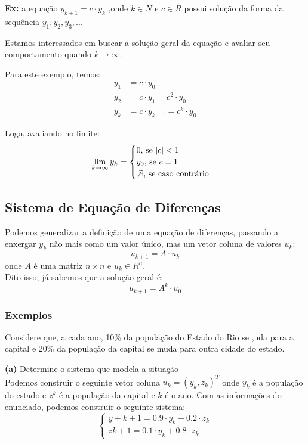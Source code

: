 \documentclass[12pt]{article}
\begin{document}
	\textbf{Ex:} a equação $y_{k+1}=c\cdot y_k\mbox{ ,onde }k\in N \mbox{ e }c\in R$ possui solução da forma da sequência $y_1,y_2,y_3,...$
	
	Estamos interessados em buscar a solução geral da equação e avaliar seu comportamento quando $k\to \infty$.
	
	Para este exemplo, temos:
	\begin{align*}
		y_1&=c\cdot y_0\\
		y_2&=c\cdot y_1=c^2\cdot y_0\\
		y_k&=c\cdot y_{k-1}=c^k\cdot y_0
	\end{align*}
	
	Logo, avaliando no limite:
	\begin{equation*}
		\lim_{k\to \infty}y_k=\begin{cases}0\mbox{, se }|c|<1\\ y_0\mbox{, se }c=1\\ \not\exists\mbox{, se caso contrário} 
		\end{cases}
	\end{equation*}
	
	\subsection{Sistema de Equação de Diferenças}
	Podemos generalizar a definição de uma equação de diferenças, passando a enxergar $y_k$ não mais como um valor único, mas um vetor coluna de valores $u_k$:
	\begin{equation*}
		u_{k+1}=A\cdot u_k
	\end{equation*}
	onde $A$ é uma matriz $n\times n$ e $u_k\in R^n$.\\
	
	Dito isso, já sabemos que a solução geral é:
	\begin{equation*}
		u_{k+1}=A^k\cdot u_0
	\end{equation*}
	
	\subsubsection{Exemplos}
	Considere que, a cada ano, 10\% da população do Estado do Rio se ,uda para a capital e 20\% da população da capital se muda para outra cidade do estado.
	
	\textbf{(a)} Determine o sistema que modela a situação\\
	
	Podemos construir o seguinte vetor coluna $u_k=(y_k,z_k)^T$ onde $y_k$ é a população do estado e $z^k$ é a população da capital e $k$ é o ano. Com as informações do enunciado, podemos construir o seguinte sistema:
	\begin{equation*}
		\begin{cases}
			y+{k+1}=0.9\cdot y_k+0.2\cdot z_k\\
			z{k+1}=0.1\cdot y_k+0.8\cdot z_k
		\end{cases}
	\end{equation*}
	
\end{document}
